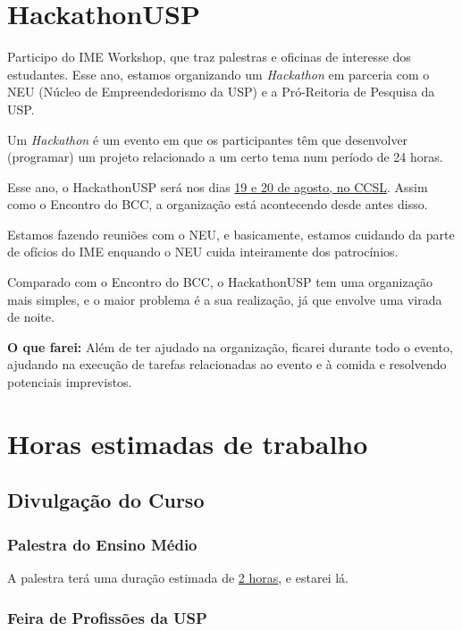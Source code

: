 \documentclass[12pt,letterpaper]{article}
\begin{document}
	\section{HackathonUSP}
	
	Participo do IME Workshop, que traz palestras e oficinas de interesse dos estudantes. Esse ano, estamos organizando um \textit{Hackathon} em parceria com o NEU (Núcleo de Empreendedorismo da USP) e a Pró-Reitoria de Pesquisa da USP.
	
	Um \textit{Hackathon} é um evento em que os participantes têm que desenvolver (programar) um projeto relacionado a um certo tema num período de 24 horas. 
	
	Esse ano, o HackathonUSP será nos dias \underline{19 e 20 de agosto, no CCSL}. Assim como o Encontro do BCC, a organização está acontecendo desde antes disso. 
	
	Estamos fazendo reuniões com o NEU, e basicamente, estamos cuidando da parte de ofícios do IME enquando o NEU cuida inteiramente dos patrocínios.
	
	Comparado com o Encontro do BCC, o HackathonUSP tem uma organização mais simples, e o maior problema é a sua realização, já que envolve uma virada de noite. 
	
	\textbf{O que farei:} Além de ter ajudado na organização, ficarei durante todo o evento, ajudando na execução de tarefas relacionadas ao evento e à comida e resolvendo potenciais imprevistos.
	
	\section{Horas estimadas de trabalho}
	
	\subsection{Divulgação do Curso}
	
	\subsubsection{Palestra do Ensino Médio}
	
	A palestra terá uma duração estimada de \underline{2 horas}, e estarei lá.
	
	\subsubsection{Feira de Profissões da USP}
	
\end{document}
